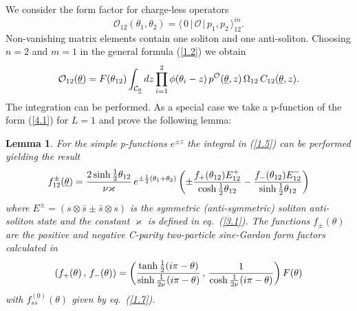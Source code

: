 \documentclass[a4paper,a4paper]{article}
\newtheorem{lemma}[theorem]{Lemma}
\begin{document}
We consider the form factor for charge-less operators 
\[
\mathcal{O}_{12}(\theta _{1},\theta _{2})=\langle \,0\,|\,\mathcal{O}%
\,|\,p_{1},p_{2}\,\rangle _{12}^{in}. 
\]
Non-vanishing matrix elements contain one soliton and one anti-soliton.
Choosing $n=2$ and $m=1$ in the general formula (\ref{1.2}) we obtain 
\begin{equation}
\mathcal{O}_{12}(\underline{\theta })=F(\theta _{12})\int_{\mathcal{C}_{%
\underline{\theta }}}dz\prod_{i=1}^{2}\phi (\theta _{i}-z)\,p^{\mathcal{O}}(%
\underline{\theta },z)\,\Omega _{12}\,C_{12}(\underline{\theta },z).
\label{1.5}
\end{equation}
The integration can be performed. As a special case we take a p-function of
the form (\ref{4.1}) for $L=1$ and prove the following lemma:

\begin{lemma}
\label{l3}For the simple p-functions $e^{\pm z}$ the integral in (\ref{1.5})
can be performed yielding the result 
\[
f_{12}^{\pm }(\underline{\theta })=\frac{2\sinh \tfrac{1}{2}\theta _{12}}{%
\nu \varkappa }\,e^{\pm \frac{1}{2}(\theta _{1}+\theta _{2})}\left( \pm 
\frac{f_{+}(\theta _{12})E_{12}^{+}}{\cosh \tfrac{1}{2}\theta _{12}}-\frac{%
f_{-}(\theta _{12})E_{12}^{-}}{\sinh \tfrac{1}{2}\theta _{12}}\right) 
\]
where $E^{\pm }=\left( s\otimes \bar{s}\pm \bar{s}\otimes s\right) $ is the
symmetric (anti-symmetric) soliton anti-soliton state and the constant $%
\varkappa $ is defined in eq.~(\ref{3.1}). The functions $f_{\pm }(\theta )$
are the positive and negative C-parity two-particle sine-Gordon form factors
calculated in \cite{KW} 
\[
\left( f_{+}(\theta )\,,\,f_{-}(\theta )\right) =\left( \frac{\tanh \frac{1}{%
2}(i\pi -\theta )}{\sinh \frac{1}{2\nu }(i\pi -\theta )}\,,\,\frac{1}{\cosh 
\frac{1}{2\nu }(i\pi -\theta )}\right) F(\theta ) 
\]
with $f_{ss}^{(0)}(\theta )$ given by eq.~(\ref{1.7}).
\end{lemma}
\end{document}
